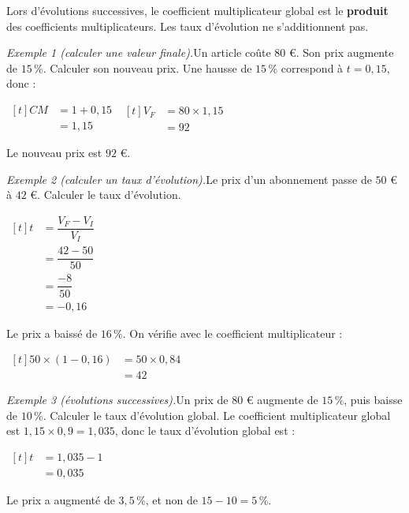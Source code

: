 \documentclass[10pt,a4paper]{article}
\begin{document}
\begin{bloc}
\begin{prop}
Lors d'évolutions successives, le coefficient multiplicateur global est le \textbf{produit} des coefficients multiplicateurs. Les taux d'évolution ne s'additionnent pas.
\end{prop}
\end{bloc}

\begin{bloc}
\textit{Exemple 1 (calculer une valeur finale).}\enspace Un article coûte \(80\) \euro. Son prix augmente de \(15\,\%\). Calculer son nouveau prix.
Une hausse de \(15\,\%\) correspond à \(t=0{,}15\), donc :

\smallskip
\(\begin{aligned}[t] CM&=1+0{,}15\\ &=1{,}15\end{aligned}\) \qquad \(\begin{aligned}[t] V_F&=80\times 1{,}15\\ &=92\end{aligned}\)

\smallskip
Le nouveau prix est \(92\) \euro.
\end{bloc}

\begin{bloc}
\textit{Exemple 2 (calculer un taux d'évolution).}\enspace Le prix d'un abonnement passe de \(50\) \euro{} à \(42\) \euro. Calculer le taux d'évolution.

\smallskip
\(\begin{aligned}[t] t&=\dfrac{V_F-V_I}{V_I}\\ &=\dfrac{42-50}{50}\\ &=\dfrac{-8}{50}\\ &=-0{,}16\end{aligned}\)

\smallskip
Le prix a baissé de \(16\,\%\). On vérifie avec le coefficient multiplicateur :

\smallskip
\(\begin{aligned}[t] 50\times(1-0{,}16)&=50\times 0{,}84\\ &=42\end{aligned}\)
\end{bloc}

\begin{bloc}
\textit{Exemple 3 (évolutions successives).}\enspace Un prix de \(80\) \euro{} augmente de \(15\,\%\), puis baisse de \(10\,\%\). Calculer le taux d'évolution global.
Le coefficient multiplicateur global est \(1{,}15\times 0{,}9=1{,}035\), donc le taux d'évolution global est :

\smallskip
\(\begin{aligned}[t] t&=1{,}035-1\\ &=0{,}035\end{aligned}\)

\smallskip
Le prix a augmenté de \(3{,}5\,\%\), et non de \(15-10=5\,\%\).
\end{bloc}
\end{document}
